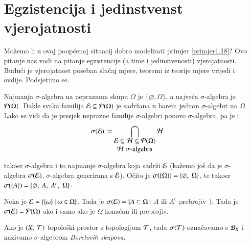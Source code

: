
\chapter{Egzistencija i jedinstvenst vjerojatnosti}

Mo\v zemo li u ovoj poop\' cenoj situacij dobro modelirati primjer
\ref{primjer1.18}? Ovo pitanje nas vodi na pitanje egzistencije
(a time i jedinstvenosti) vjerojatnosti. Budu\' ci je vjerojatnost
poseban slu\v caj mjere, teoremi iz teorije mjere vrijedi i ovdije.
Podsjetimo se.

Najmanja $\sigma$-algebra na nepraznom skupu $\Omega$ je
$\{\varnothing, \Omega\}$, a najve\' ca $\sigma$-algebra je
$\mathcal{P}({\Omega})$.
Dakle svaka familija $\mathcal{E} \subseteq \mathcal{P}({\Omega})$ je sadr\v zana
u barem jednon $\sigma$-algebri na $\Omega$.
Lako se vidi da je presjek neprazne familije $\sigma$-algebri ponovo
$\sigma$-algebra, pa je i
\begin{equation} \label{jed:2.1}
    \sigAlg{\E} := \presjek{\shortstack{$\E \subseteq \hh \subseteq
    \partitive{\Omega}$ \\ $\hh$ $\sigma$-algebra}}{} 
        \hh
\end{equation}

tako\dj er $\sigma$-algebra i to najmanje $\sigma$-algebra koja
sadr\v zi $\mathcal{E}$ (ka\v zemo jo\v s da je $\sigma$-algebra
$\sigma({\mathcal{E}})$, $\sigma$-algebra generirana s $\mathcal{E}$).
O\v cito je $\sigma({\{\Omega\}}) = \{ \varnothing, \; \Omega\}$,
te tako\dj er
$\sigma({\{A\}}) = \{ \varnothing, \; A, \; A^c, \; \Omega \}$.

\begin{zad} \label{zad:2.2}
    Neka je $\mathcal{E} = \{{\{ \omega \}} \: | \: {\omega \in \Omega}\}$.
    Tada je $\sigma({\mathcal{E}}) =\{ A \subseteq \Omega \: |$ $A$ ili $A^c$
    prebrojiv $\}$. Tada je $\sigma({\mathcal{E}}) = \mathcal{P}({\Omega})$ ako
    i samo ako je $\Omega$ kona\v can ili prebrojiv.
\end{zad}

%
%

Ako je $(X, \: \mathcal{T})$ topolo\v ski prostor s topologijom $\mathcal{T}$, tada
$\sigma({\mathcal{T}})$ ozna\v cavamo s $\mathcal{B}_{X}$ i nazivamo
$\sigma$-algebrom \emph{Borelovih skupova}.

